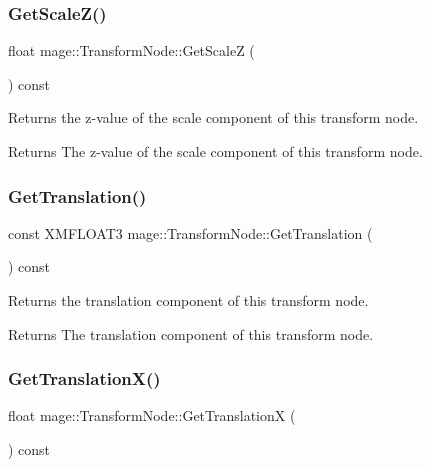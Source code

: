 \subsubsection{\texorpdfstring{Get\+Scale\+Z()}{GetScaleZ()}}
{\footnotesize\ttfamily float mage\+::\+Transform\+Node\+::\+Get\+ScaleZ (\begin{DoxyParamCaption}{ }\end{DoxyParamCaption}) const}

Returns the z-\/value of the scale component of this transform node.

\begin{DoxyReturn}{Returns}
The z-\/value of the scale component of this transform node. 
\end{DoxyReturn}
\hypertarget{classmage_1_1_transform_node_a827c4ea5520141eb50866283acef95ad}{}\label{classmage_1_1_transform_node_a827c4ea5520141eb50866283acef95ad} 
\subsubsection{\texorpdfstring{Get\+Translation()}{GetTranslation()}}
{\footnotesize\ttfamily const X\+M\+F\+L\+O\+A\+T3 mage\+::\+Transform\+Node\+::\+Get\+Translation (\begin{DoxyParamCaption}{ }\end{DoxyParamCaption}) const}

Returns the translation component of this transform node.

\begin{DoxyReturn}{Returns}
The translation component of this transform node. 
\end{DoxyReturn}
\hypertarget{classmage_1_1_transform_node_a31b8818a43af8633136f345e30572723}{}\label{classmage_1_1_transform_node_a31b8818a43af8633136f345e30572723} 
\subsubsection{\texorpdfstring{Get\+Translation\+X()}{GetTranslationX()}}
{\footnotesize\ttfamily float mage\+::\+Transform\+Node\+::\+Get\+TranslationX (\begin{DoxyParamCaption}{ }\end{DoxyParamCaption}) const}

